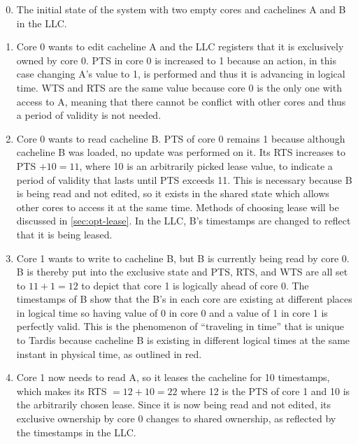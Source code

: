 \documentclass[12pt]{article}
\begin{document}
\begin{enumerate}
\setcounter{enumi}{-1}




\item The initial state of the system with two empty cores and cachelines A and B in the LLC.

\item Core 0 wants to edit cacheline A and the LLC registers that it is 
exclusively owned by core 0. PTS in core 0 is increased to 1 because 
an action, in this case changing A's value to 1, is performed and thus 
it is advancing in logical time. WTS and RTS are the same value because core 0 is the only one with access to A, meaning that there cannot be conflict with other cores and thus a period of validity is not needed.

\item Core 0 wants to read cacheline B. PTS of core 0 remains 1 because 
although cacheline B was loaded, no update was performed on it. Its RTS increases to PTS $+ 10 = 11$, where 10 is an 
arbitrarily picked lease value, to indicate a period of validity that 
lasts until PTS exceeds 11. This is necessary because B is being read and not edited, so it exists in the shared state which allows other cores to access it at the same time. Methods of choosing lease will be 
discussed in \cref{sec:opt-lease}. In the LLC, B's timestamps are  
changed to reflect that it is being leased.

\item Core 1 wants to write to cacheline B, but B is currently being read by core 
0. B is thereby put into the exclusive state and PTS, RTS, and WTS are all 
set to $11 + 1 = 12$ to depict that core 1 is logically ahead of core 0.  
The timestamps of B show that the B's in each core are existing at different 
places in logical time so having value of 0 in core 0 and 
a value of 1 in core 1 is perfectly valid. This is the phenomenon of 
``traveling in time'' that is unique to Tardis because cacheline B is 
existing in different logical times at the same instant in physical 
time, as outlined in red.

\item Core 1 now needs to read A, so it leases the cacheline for 10 
timestamps, which makes its RTS $= 12 + 10 = 22$ where 12 is the PTS of 
core 1 and 10 is the arbitrarily chosen lease. Since it is now being 
read and not edited, its exclusive ownership by core 0 changes to 
shared ownership, as reflected by the timestamps in the LLC.
\end{enumerate}
\end{document}
